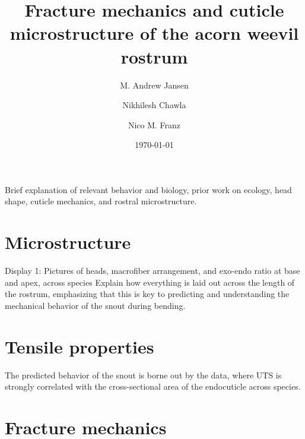 \documentclass[twocolumn, linenumbers, superscriptaddress]{revtex4-1}
\begin{document}
	\begin{abstract}
		\blindtext
	\end{abstract}
	
	{\title{Fracture mechanics and cuticle microstructure of the acorn weevil rostrum}
	
	\date{\today}
	
	\author{M. Andrew Jansen}
	\author{Nikhilesh Chawla}
	\author{Nico M. Franz}
		
	\maketitle
	}
	
	Brief explanation of relevant behavior and biology, prior work on ecology, head shape, cuticle mechanics, and rostral microstructure.
	\lipsum
	
	\section*{Microstructure}
		Display 1: Pictures of heads, macrofiber arrangement, and exo-endo ratio at base and apex, across species
		Explain how everything is laid out across the length of the rostrum, emphasizing that this is key to predicting and understanding the mechanical behavior of the snout during bending.
		\lipsum

	\section*{Tensile properties}
		The predicted behavior of the snout is borne out by the data, where UTS is strongly correlated with the cross-sectional area of the endocuticle across species.
		\lipsum
	
	\section*{Fracture mechanics}
		\lipsum
		
\end{document}
